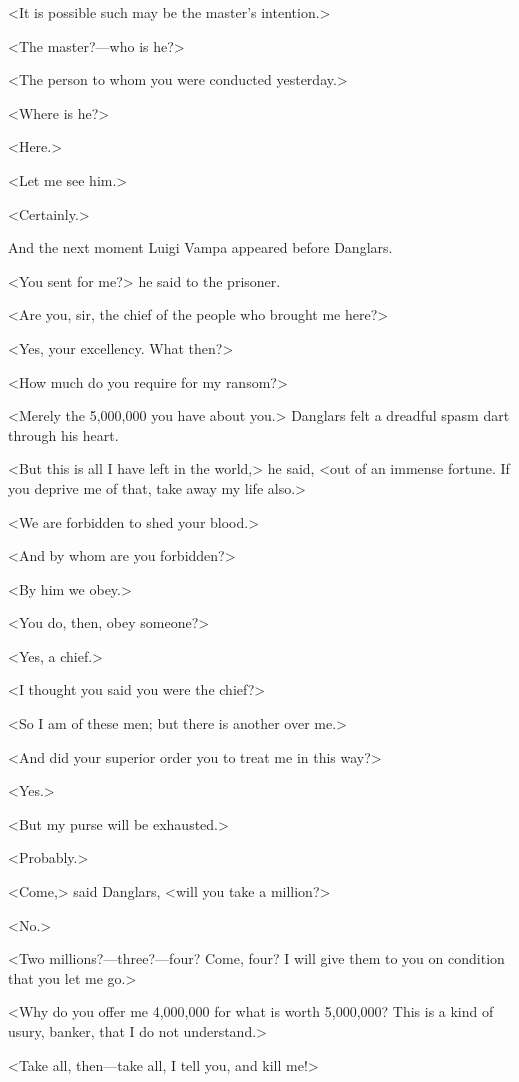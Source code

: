  <It is possible such may be the master's intention.> 

 <The master?—who is he?> 

 <The person to whom you were conducted yesterday.> 

 <Where is he?> 

 <Here.> 

 <Let me see him.> 

 <Certainly.> 

 And the next moment Luigi Vampa appeared before Danglars. 

 <You sent for me?> he said to the prisoner. 

 <Are you, sir, the chief of the people who brought me here?> 

 <Yes, your excellency. What then?> 

 <How much do you require for my ransom?> 

 <Merely the 5,000,000 you have about you.> Danglars felt a dreadful spasm dart through his heart. 

 <But this is all I have left in the world,> he said, <out of an immense fortune. If you deprive me of that, take away my life also.> 

 <We are forbidden to shed your blood.> 

 <And by whom are you forbidden?> 

 <By him we obey.> 

 <You do, then, obey someone?> 

 <Yes, a chief.> 

 <I thought you said you were the chief?> 

 <So I am of these men; but there is another over me.> 

 <And did your superior order you to treat me in this way?> 

 <Yes.> 

 <But my purse will be exhausted.> 

 <Probably.> 

 <Come,> said Danglars, <will you take a million?> 

 <No.> 

 <Two millions?—three?—four? Come, four? I will give them to you on condition that you let me go.> 

 <Why do you offer me 4,000,000 for what is worth 5,000,000? This is a kind of usury, banker, that I do not understand.> 

 <Take all, then—take all, I tell you, and kill me!> 

